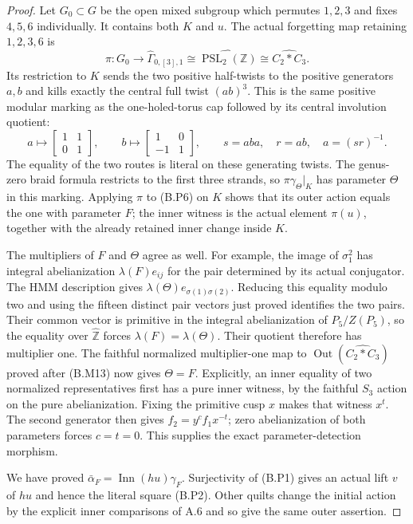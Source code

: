 \begin{proof}
Let $G_0\subset G$ be the open mixed subgroup which permutes
$1,2,3$ and fixes $4,5,6$ individually. It contains both $K$ and
$u$. The actual forgetting map retaining $1,2,3,6$ is
\[
 \pi:G_0\longrightarrow
       \widehat\Gamma_{0,[3],1}
       \cong\widehat{\operatorname{PSL}_2(\mathbb Z)}
       \cong\widehat{C_2*C_3}.                            \tag{B.P7}
\]
Its restriction to $K$ sends the two positive half-twists to the
positive generators $a,b$ and kills exactly the central full twist
$(ab)^3$. This is the same positive modular marking as the
one-holed-torus cap followed by its central involution quotient:
\[
 a\longmapsto
   \left[\begin{smallmatrix}1&1\\0&1\end{smallmatrix}\right],
 \qquad
 b\longmapsto
   \left[\begin{smallmatrix}1&0\\-1&1\end{smallmatrix}\right],
 \qquad s=aba,\quad r=ab,\quad a=(sr)^{-1}.
\]
The equality of the two routes is literal on these generating
twists. The genus-zero braid formula restricts to the first three
strands, so $\pi\gamma_\Theta|_K$ has parameter $\Theta$ in this
marking. Applying $\pi$ to (B.P6) on $K$ shows that its outer action
equals the one with parameter $F$; the inner witness is the actual
element $\pi(u)$, together with the already retained inner change
inside $K$.

The multipliers of $F$ and $\Theta$ agree as well. For example,
the image of $\sigma_1^2$ has integral abelianization
$\lambda(F)e_{ij}$ for the pair determined by its actual conjugator.
The HMM description gives
$\lambda(\Theta)e_{\sigma(1)\sigma(2)}$. Reducing this equality
modulo two and using the fifteen distinct pair vectors just proved
identifies the two pairs. Their common vector is primitive in the
integral abelianization of $P_5/Z(P_5)$, so the equality over
$\widehat{\mathbb Z}$ forces
$\lambda(F)=\lambda(\Theta)$. Their quotient therefore has multiplier one.
The faithful normalized multiplier-one map to
$\operatorname{Out}(\widehat{C_2*C_3})$ proved after (B.M13) now
gives $\Theta=F$. Explicitly, an inner equality of two normalized
representatives first has a pure inner witness, by the faithful
$S_3$ action on the pure abelianization. Fixing the primitive cusp
$x$ makes that witness $x^t$. The second generator then gives
$f_2=y^c f_1x^{-t}$; zero abelianization of both parameters forces
$c=t=0$. This supplies the exact parameter-detection morphism.

We have proved $\bar\alpha_F=\operatorname{Inn}(hu)\gamma_F$.
Surjectivity of (B.P1) gives an actual lift $v$ of $hu$ and hence
the literal square (B.P2). Other quilts change the initial action
by the explicit inner comparisons of A.6 and so give the same
outer assertion.
\end{proof}

